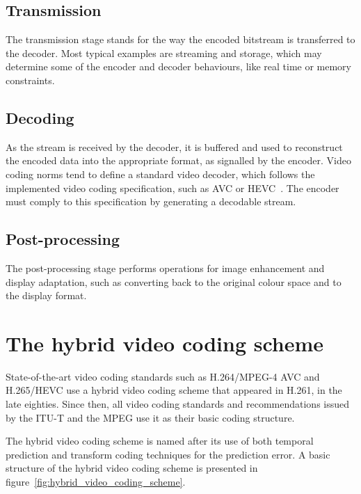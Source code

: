 \documentclass[11pt,a4paper,openright,twoside]{book}
\numberwithin{equation}{section} %
\numberwithin{figure}{section} %
\numberwithin{table}{section} %
\begin{document}
\subsection{Transmission}
\label{sub:transmission}

The transmission stage stands for the way the encoded bitstream is
transferred to the decoder.
Most typical examples are streaming and storage, which may determine
some of the encoder and decoder behaviours, like real time or memory
constraints.

\subsection{Decoding}
\label{sub:decoding}

As the stream is received by the decoder, it is buffered and used to
reconstruct the encoded data into the appropriate format, as signalled
by the encoder.
Video coding norms tend to define a standard video decoder, which
follows the implemented video coding specification, such as \ac{AVC}
or \ac{HEVC}~\cite{itu-14-h265-hevc-rec,sullivan-12-overview-hevc}.
The encoder must comply to this specification by generating a decodable
stream.

\subsection{Post-processing}
\label{sub:post_processing}

The post-processing stage performs operations for image enhancement and
display adaptation, such as converting back to the original colour
space and to the display format.

\section{The hybrid video coding scheme}
\label{sec:the_hybrid_video_coding_scheme}

State-of-the-art video coding standards such as H.264/\acs{MPEG}-4 \acs{AVC}
and H.265/\acs{HEVC} use a hybrid video coding scheme that appeared in
H.261, in the late eighties.
Since then, all video coding standards and recommendations issued by the
\ac{ITU-T} and the \ac{MPEG} use it as their basic coding structure.

The hybrid video coding scheme is named after its use of both temporal
prediction and transform coding techniques for the prediction error.
A basic structure of the hybrid video coding scheme is presented in
figure~\ref{fig:hybrid_video_coding_scheme}.
\end{document}
